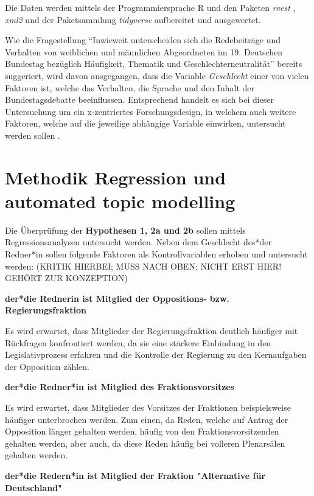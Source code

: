 \documentclass[12pt, 
    twoside=false, 
    bibliography=totoc, 
    numbers=endperiod, 
    headings=normal, 
    toc=chapterentrydotfill
    ]{scrbook}
\begin{document}
Die Daten werden mittels der Programmiersprache R \parencite{rcoreteam_2018} und den Paketen \emph{rvest} \parencite{wickham_2016}, \emph{xml2} \parencite{wickham_2018} und der Paketsammlung \emph{tidyverse} \parencite{wickham_2017} aufbereitet und ausgewertet.


Wie die Fragestellung \enquote{Inwieweit unterscheiden sich die Redebeiträge und Verhalten von weiblichen und männlichen
Abgeordneten im 19. Deutschen Bundestag bezüglich Häufigkeit, Thematik und Geschlechterneutralität} bereits suggeriert, wird davon ausgegangen, dass die Variable \emph{Geschlecht} einer von vielen Faktoren ist, welche das Verhalten, die Sprache und den Inhalt der Bundestagsdebatte beeinflussen. Entsprechend handelt es sich bei dieser Untersuchung um ein x-zentriertes Forschungsdesign, in welchem auch weitere Faktoren, welche auf die jeweilige abhängige Variable einwirken, untersucht werden sollen  \parencites[vgl.][3f.]{ganghof_2005}.

\section{Methodik Regression und automated topic modelling}


Die Überprüfung der \textbf{Hypothesen 1, 2a und 2b} sollen mittels Regressionsanalysen untersucht werden. Neben dem Geschlecht des*der Redner*in sollen folgende Faktoren als Kontrollvariablen erhoben und untersucht werden: (KRITIK HIERBEI; MUSS NACH OBEN; NICHT ERST HIER! GEHÖRT ZUR KONZEPTION)

\textbf{der*die Rednerin ist Mitglied der Oppositions- bzw. Regierungsfraktion}

Es wird erwartet, dass Mitglieder der Regierungsfraktion deutlich häufiger mit Rückfragen konfrontiert werden, da sie eine stärkere Einbindung in den Legislativprozess erfahren und die Kontrolle der Regierung zu den Kernaufgaben der Opposition zählen.

\textbf{der*die Redner*in ist Mitglied des Fraktionsvorsitzes}

Es wird erwartet, dass Mitglieder des Vorsitzes der Fraktionen beispielsweise häufiger unterbrochen werden. Zum einen, da Reden, welche auf Antrag der Opposition länger gehalten werden, häufig von den Fraktionsvorsitzenden gehalten werden, aber auch, da diese Reden häufig bei volleren Plenarsälen gehalten werden.

\textbf{der*die Redern*in ist Mitglied der Fraktion "Alternative für Deutschland"}
\end{document}
